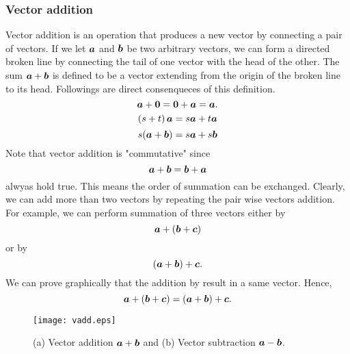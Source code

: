 \documentclass[10pt,a4j]{article}
\begin{document}
\subsubsection{Vector addition}
Vector addition is an operation that produces a new vector by connecting a pair of vectors. 
If we let $\mbox{\boldmath $a$}$ and $\mbox{\boldmath $b$}$ be two arbitrary vectors, 
we can form a directed broken line by connecting the tail of one vector with 
the head of the other. The sum $\mbox{\boldmath $a$}+\mbox{\boldmath $b$}$ is defined to be a vector 
extending from the origin of the broken line to its head.
Followings are direct consenqueces of this definition.
\begin{equation}
	\mbox{\boldmath $a$}+\mbox{\boldmath $0$} = \mbox{\boldmath $0$}+\mbox{\boldmath $a$}=\mbox{\boldmath $a$}. 
\end{equation}
\begin{equation}
	\left(s+t \right)\mbox{\boldmath $a$}= s\mbox{\boldmath $a$}+ t\mbox{\boldmath $a$}
	\label{eqn:}
\end{equation}
\begin{equation}
	s(\mbox{\boldmath $a$}+\mbox{\boldmath $b$})=s\mbox{\boldmath $a$}+s\mbox{\boldmath $b$}
	\label{eqn:}
\end{equation}
Note that vector addition is "commutative" since 
\begin{equation}
	\mbox{\boldmath $a$}+\mbox{\boldmath $b$}=\mbox{\boldmath $b$}+\mbox{\boldmath $a$}
\end{equation}
alwyas hold true. This means the order of summation can be exchanged. 
Clearly, we can add more than two vectors by repeating the pair wise vectors addition.
For example, we can perform summation of three vectors either by 
\[
	\mbox{\boldmath $a$}+\left( \mbox{\boldmath $b$}+\mbox{\boldmath $c$} \right)
\]
or by 
\[
	\left( \mbox{\boldmath $a$}+\mbox{\boldmath $b$} \right) + \mbox{\boldmath $c$}.
\]
We can prove graphically that the addition by result in a same vector. Hence, 
\begin{equation}
	\mbox{\boldmath $a$}+\left( \mbox{\boldmath $b$}+\mbox{\boldmath $c$} \right)
	=
	\left( \mbox{\boldmath $a$}+\mbox{\boldmath $b$} \right) + \mbox{\boldmath $c$}.
\end{equation}
\begin{figure}[h]
	\begin{center}
	\texttt{[image: vadd.eps]} 
	\end{center}
	\caption{(a) Vector addition $\mbox{\boldmath $a$}+\mbox{\boldmath $b$}$ and 
	(b) Vector subtraction $\mbox{\boldmath $a$}-\mbox{\boldmath $b$}$.} 
	\label{fig:1_4}
\end{figure}
\end{document}

